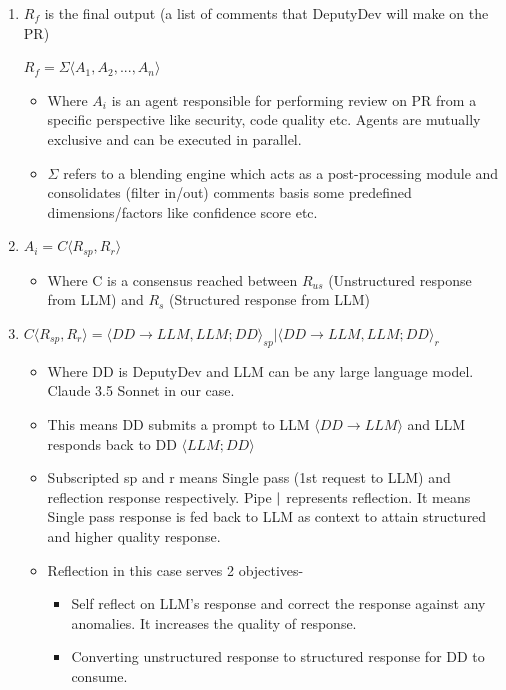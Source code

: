 \begin{enumerate}
    \item $R_f$ is the final output (a list of comments that DeputyDev will make on the PR)
    
    $R_f = \Sigma\langle A_1, A_2, ..., A_n\rangle$
    
    \begin{itemize}
        \item Where $A_i$ is an agent responsible for performing review on PR from a specific perspective like security, code quality etc. Agents are mutually exclusive and can be executed in parallel.
        \item $\Sigma$ refers to a blending engine which acts as a post-processing module and consolidates (filter in/out) comments basis some predefined dimensions/factors like confidence score etc.
    \end{itemize}
    
    \item $A_i = C\langle R_{sp}, R_r\rangle$
    \begin{itemize}
        \item Where C is a consensus reached between $R_{us}$ (Unstructured response from LLM) and $R_s$ (Structured response from LLM)
    \end{itemize}
    
    \item $C\langle R_{sp}, R_r\rangle = \langle DD \rightarrow LLM, LLM ; DD\rangle_{sp} | \langle DD \rightarrow LLM, LLM ; DD\rangle_r$
    \begin{itemize}
        \item Where DD is DeputyDev and LLM can be any large language model. Claude 3.5 Sonnet in our case.
        \item This means DD submits a prompt to LLM $\langle DD \rightarrow LLM\rangle$ and LLM responds back to DD $\langle LLM ; DD\rangle$
        \item Subscripted sp and r means Single pass (1st request to LLM) and reflection response respectively. Pipe $ \mathbin{\vert} $ represents reflection. It means Single pass response is fed back to LLM as context to attain structured and higher quality response.
        \item Reflection in this case serves 2 objectives-
        \begin{itemize}
            \item Self reflect on LLM's response and correct the response against any anomalies. It increases the quality of response.
            \item Converting unstructured response to structured response for DD to consume.
        \end{itemize}
    \end{itemize}
\end{enumerate}